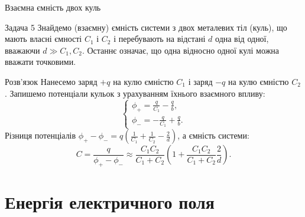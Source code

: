 \documentclass[onlytextwidth]{beamer}
\begin{document}
\begin{frame}{Взаємна ємність двох куль}{}
	\begin{exampleblock}{\scriptsize Задача 5}\scriptsize\justifying
		Знайдемо (взаємну) ємність системи з двох металевих тіл (куль), що мають власні ємності
		$C_1$ і $C_2$ і перебувають на відстані $d$ одна від одної, вважаючи $d \gg C_1,C_2$.
		Останнє означає, що одна відносно одної кулі можна вважати точковими.
	\end{exampleblock}
	\begin{center}
	\end{center}
	\begin{block}{\scriptsize Розв'язок}\scriptsize\justifying
		Нанесемо заряд $+q$ на кулю ємністю $C_1$ і заряд $-q$ на кулю ємністю $C_2$. Запишемо
		потенціали кульок з урахуванням їхнього взаємного впливу:
		\begin{equation*}
			\begin{cases}
				\phi_+ = \frac{q}{C_1} - \frac{q}{b}, \\
				\phi_- = -\frac{q}{C_1} + \frac{q}{b}.
			\end{cases}
		\end{equation*}
		Різниця потенціалів $\phi_+ - \phi_- = q\left( \frac1{C_1} + \frac1{C_2} - \frac2d\right) $, а
		ємність системи:
		\begin{equation*}
			C = \frac{q}{\phi_+ - \phi_-} \approx \frac{C_1C_2}{C_1 + C_2} \left(1 + \frac{C_1C_2}{C_1 +
				C_2}\frac2{d} \right) .
		\end{equation*}
	\end{block}
\end{frame}


\section{Енергія електричного поля}
\end{document}
